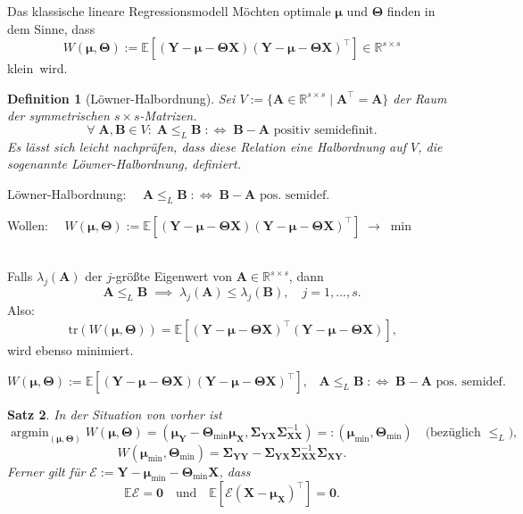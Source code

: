 \documentclass[12pt, aspectratio=169]{beamer}
\newcommand{\E}{\mathbb{E}}
\newcommand{\R}{\mathbb{R}}
\newcommand{\X}{\mathbf{X}}
\newcommand{\Y}{\mathbf{Y}}
\newcommand{\T}{\bm{\Theta}}
\newcommand{\muu}{\bm{\mu}}
\newcommand{\Ssigma}{\bm{\Sigma}}
\newcommand{\A}{\mathbf{A}}
\newcommand{\B}{\mathbf{B}}
\newcommand{\tr}{\mathrm{tr}}
\DeclareMathOperator*{\argmin}{argmin}
\newtheorem{ddefinition}{Definition}[section]
\newtheorem{dtheorem}[ddefinition]{Satz}
\begin{document}
\begin{frame}{Das klassische lineare Regressionsmodell}
	Möchten optimale $\muu$ und $\T$ finden in dem Sinne, dass
	$$W(\muu, \T) := \E[(\Y - \muu - \T \X)(\Y - \muu - \T \X)^\top] \in \R^{s \times s}$$ 
	\glqq klein\grqq $\,$ wird.
	\begin{ddefinition}[Löwner-Halbordnung]
		Sei $V:= \{\A \in \R^{s \times s} \;|\; \A^\top = \A \}$ der Raum der symmetrischen $s \times s$-Matrizen.
		$$\forall \; \A, \B \in V: \; \A \leq_L \B \; :\Leftrightarrow \; \B - \A \text{ positiv semidefinit.}$$
		Es lässt sich leicht nachprüfen, dass diese Relation eine Halbordnung auf $V$, die sogenannte Löwner-Halbordnung, definiert.
	\end{ddefinition}
\end{frame}

\begin{frame}
	\begin{alertblock}{}
		\begin{center}
			Löwner-Halbordnung: $ \quad \A \leq_L \B \; :\Leftrightarrow \; \B - \A \text{ pos. semidef.}$
		\end{center}
	\end{alertblock}
	\begin{alertblock}{}
		\begin{center}
			Wollen: $ \quad W(\muu, \T) := \E[(\Y - \muu - \T \X)(\Y - \muu - \T \X)^\top] \; \rightarrow \; \min$
		\end{center}
	\end{alertblock}
$\;$ \\
	Falls $\lambda_j(\A)$ der $j$-größte Eigenwert von $\A \in \R^{s\times s}$, dann
	$$\A \leq_L \B \; \implies \; \lambda_j(\A) \leq \lambda_j(\B),  \quad j=1, \dots,s \text{.}$$
	Also:
	\[\tr(W(\muu, \T)) = \E[(\Y - \muu - \T \X)^{\top} (\Y - \muu - \T \X)] \text{,}\]
	wird ebenso minimiert.
\end{frame}

\begin{frame}
	\begin{alertblock}{}
	\begin{center}
		$W(\muu, \T) := \E[(\Y - \muu - \T \X)(\Y - \muu - \T \X)^\top] \text{,} \quad \A \leq_L \B \; :\Leftrightarrow \; \B - \A \text{ pos. semidef.}$
	\end{center}
	\end{alertblock}
	\begin{dtheorem}
		\label{thm:mr}
		In der Situation von vorher ist
		$$ \argmin_{(\muu, \T)} W(\muu, \T) = (\muu_\Y - \T_{\min} \muu_\X, \Ssigma_{\Y\X} \Ssigma_{\X\X}^{-1}) =: (\muu_{\min}, \T_{\min})  \quad \text{(bezüglich } \leq_L \text{),} $$
		$$W(\muu_{\min}, \T_{\min}) = \Ssigma_{\Y\Y} - \Ssigma_{\Y\X} \Ssigma_{\X\X}^{-1} \Ssigma_{\X\Y} \text{.}$$
		Ferner gilt für $\mathcal{E} := \Y - \muu_{\min} - \T_{\min} \X$, dass 
		$$\E \mathcal{E} = \mathbf{0} \quad \text{und} \quad \E[\mathcal{E}(\X - \muu_\X)^\top] = \mathbf{0} \text{.}$$
	\end{dtheorem}
\end{frame}
\end{document}
